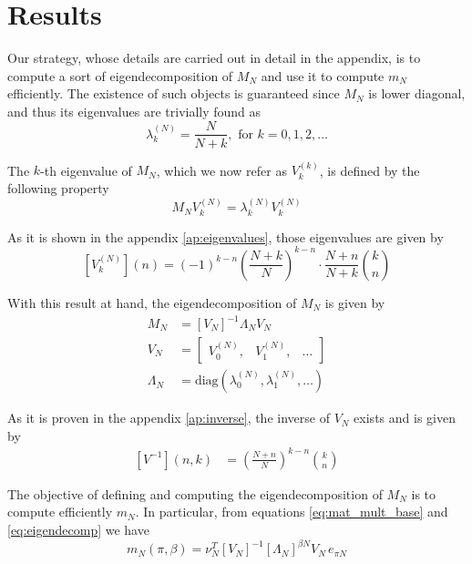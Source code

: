 \documentclass{article}
\newcommand{\ppar}[1]{\left( #1 \right)}
\newcommand{\spar}[1]{\left[ #1 \right]}
\begin{document}

\section{Results}
\label{sec:result}

Our strategy, whose details are carried out in detail in the appendix, is to compute a sort of eigendecomposition of $M_N$ and use it to compute $m_N$ efficiently.
%
The existence of such objects is guaranteed since $M_N$ is lower diagonal, and thus its eigenvalues are trivially found as
\begin{equation}
    \lambda^{(N)}_k = \frac{N}{N+k}, \text{ for } k=0,1, 2, \dots
\end{equation}

The $k$-th eigenvalue of $M_N$, which we now refer as $V_k^{(k)}$, is defined by the following property
\begin{equation}
    M_N V_k^{(N)} = \lambda^{(N)}_k V_k^{(N)}
\end{equation}

As it is shown in the appendix \ref{ap:eigenvalues}, those eigenvalues are given by
\begin{equation}
    \spar{V_k^{(N)}}(n) =
    (-1)^{k-n} \ppar{\frac{N+k}{N}}^{k-n} \cdot \frac{N+n}{N+k} \binom{k}{n}
\end{equation}

With this result at hand, the eigendecomposition of $M_N$ is given by
\begin{align}
    M_N &= \spar{V_N}^{-1} \Lambda_N V_N 
    \label{eq:eigendecomp}
    \\
    V_N &= \begin{bmatrix}
        V_0^{(N)}, & V_1^{(N)}, & \dots
    \end{bmatrix} \\
    \Lambda_N &= \text{diag}\ppar{\lambda^{(N)}_0, \lambda^{(N)}_1, \dots}
\end{align}

As it is proven in the appendix \ref{ap:inverse}, the inverse of $V_N$ exists and is given by
\begin{align}
    \spar{V^{-1}}(n,k) &=
    \ppar{\frac{N+n}{N}}^{k-n} \binom{k}{n}
\end{align}

The objective of defining and computing the eigendecomposition of $M_N$ is to compute efficiently $m_N$.
%
In particular, from equations \eqref{eq:mat_mult_base} and \eqref{eq:eigendecomp} we have
\begin{equation}
    m_N(\pi, \beta) = \nu_N^T 
    \spar{V_N}^{-1} \spar{\Lambda_N}^{\beta N} V_N\,
    e_{\pi N}
\end{equation}
\end{document}
